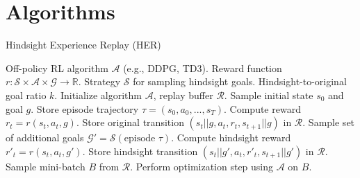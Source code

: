 \section{Algorithms}

\begin{frame}{Hindsight Experience Replay (HER)}
    \begin{algorithm}[H]
        \captionsetup{font=scriptsize}
        \caption{Hindsight Experience Replay}
        \begin{algorithmic}[1]
        \scriptsize
        \REQUIRE Off-policy RL algorithm $\mathcal{A}$ (e.g., DDPG, TD3).
        \REQUIRE Reward function $r: \mathcal{S} \times \mathcal{A} \times \mathcal{G} \to \mathbb{R}$.
        \REQUIRE Strategy $\mathcal{S}$ for sampling hindsight goals.
        \REQUIRE Hindsight-to-original goal ratio $k$.
        \STATE Initialize algorithm $\mathcal{A}$, replay buffer $\mathcal{R}$.
            \STATE Sample initial state $s_0$ and goal $g$. Store episode trajectory $\tau = (s_0, a_0, ..., s_T)$.
                \STATE Compute reward $r_t = r(s_t, a_t, g)$.
                \STATE Store original transition $(s_t || g, a_t, r_t, s_{t+1} || g)$ in $\mathcal{R}$. 
                \STATE Sample set of additional goals $\mathcal{G}' = \mathcal{S}(\text{episode } \tau)$.
                     \STATE Compute hindsight reward $r'_t = r(s_t, a_t, g')$.
                     \STATE Store hindsight transition $(s_t || g', a_t, r'_t, s_{t+1} || g')$ in $\mathcal{R}$. 
                \ENDFOR
            \ENDFOR
                 \STATE Sample mini-batch $B$ from $\mathcal{R}$.
                 \STATE Perform optimization step using $\mathcal{A}$ on $B$.
            \ENDFOR
        \ENDFOR
        \end{algorithmic}
    \end{algorithm}
\end{frame}


